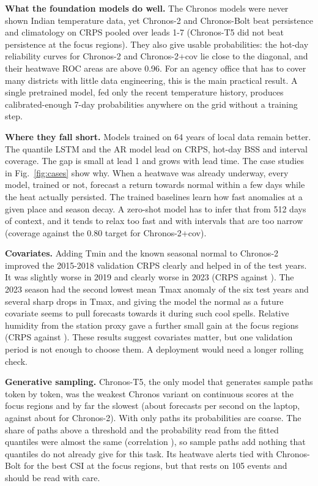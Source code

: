 \textbf{What the foundation models do well.} The Chronos models were never shown Indian temperature data, yet Chronos-2 and Chronos-Bolt beat persistence and climatology on CRPS pooled over leads 1-7 (Chronos-T5 did not beat persistence at the focus regions). They also give usable probabilities: the hot-day reliability curves for Chronos-2 and Chronos-2+cov lie close to the diagonal, and their heatwave ROC areas are above 0.96. For an agency office that has to cover many districts with little data engineering, this is the main practical result. A single pretrained model, fed only the recent temperature history, produces calibrated-enough 7-day probabilities anywhere on the grid without a training step.

\textbf{Where they fall short.} Models trained on 64 years of local data remain better. The quantile LSTM and the AR model lead on CRPS, hot-day BSS and interval coverage. The gap is small at lead 1 and grows with lead time. The case studies in Fig.~\ref{fig:cases} show why. When a heatwave was already underway, every model, trained or not, forecast a return towards normal within a few days while the heat actually persisted. The trained baselines learn how fast anomalies at a given place and season decay. A zero-shot model has to infer that from 512 days of context, and it tends to relax too fast and with intervals that are too narrow (coverage \CovChronostwocov{} against the 0.80 target for Chronos-2+cov).

\textbf{Covariates.} Adding Tmin and the known seasonal normal to Chronos-2 improved the 2015-2018 validation CRPS clearly and helped in \CovBetterYears{} of the \CovYearsTotal{} test years. It was slightly worse in 2019 and clearly worse in 2023 (CRPS \CRPSChronostwocovYtwozerotwothree{} against \CRPSChronostwoYtwozerotwothree{}). The 2023 season had the second lowest mean Tmax anomaly of the six test years and several sharp drops in Tmax, and giving the model the normal as a future covariate seems to pull forecasts towards it during such cool spells. Relative humidity from the station proxy gave a further small gain at the focus regions (CRPS \FocusCRPSChronostwocovRH{} against \FocusCRPSChronostwocov{}). These results suggest covariates matter, but one validation period is not enough to choose them. A deployment would need a longer rolling check.

\textbf{Generative sampling.} Chronos-T5, the only model that generates sample paths token by token, was the weakest Chronos variant on continuous scores at the focus regions and by far the slowest (about \SpeedChronosTfive{} forecasts per second on the laptop, against about \SpeedChronostwo{} for Chronos-2). With only \TFiveSamples{} paths its probabilities are coarse. The share of paths above a threshold and the probability read from the fitted quantiles were almost the same (correlation \TFiveCorr{}), so sample paths add nothing that quantiles do not already give for this task. Its heatwave alerts tied with Chronos-Bolt for the best CSI at the focus regions, but that rests on 105 events and should be read with care.

